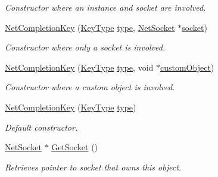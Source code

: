 \begin{DoxyCompactItemize}
\begin{DoxyCompactList}\small\item\em Constructor where an instance and socket are involved. \item\end{DoxyCompactList}\item 
\hyperlink{class_net_completion_key_a2d4ed1339d4b1f0e7a8d7ee00a24b12f}{NetCompletionKey} (\hyperlink{class_net_completion_key_a129b5d89d5f2ac58abcc9872adc85d32}{KeyType} \hyperlink{class_net_completion_key_ab688ca4ac39575c1e1edecbd7fe09a10}{type}, \hyperlink{class_net_socket}{NetSocket} $\ast$\hyperlink{class_net_completion_key_ae4108c1fd628613e8b36eb8d11ac4f5e}{socket})
\begin{DoxyCompactList}\small\item\em Constructor where only a socket is involved. \item\end{DoxyCompactList}\item 
\hyperlink{class_net_completion_key_a91004675386d0efda59d93d7436208b8}{NetCompletionKey} (\hyperlink{class_net_completion_key_a129b5d89d5f2ac58abcc9872adc85d32}{KeyType} \hyperlink{class_net_completion_key_ab688ca4ac39575c1e1edecbd7fe09a10}{type}, void $\ast$\hyperlink{class_net_completion_key_a2d939786562a2b929045159eee0836b3}{customObject})
\begin{DoxyCompactList}\small\item\em Constructor where a custom object is involved. \item\end{DoxyCompactList}\item 
\hyperlink{class_net_completion_key_a1d5c233c1012884dec3737d809c1cd48}{NetCompletionKey} (\hyperlink{class_net_completion_key_a129b5d89d5f2ac58abcc9872adc85d32}{KeyType} \hyperlink{class_net_completion_key_ab688ca4ac39575c1e1edecbd7fe09a10}{type})
\begin{DoxyCompactList}\small\item\em Default constructor. \item\end{DoxyCompactList}\item 
\hyperlink{class_net_socket}{NetSocket} $\ast$ \hyperlink{class_net_completion_key_a179a2ae168d52e747ddb71697c3c74e9}{GetSocket} ()
\begin{DoxyCompactList}\small\item\em Retrieves pointer to socket that owns this object. \item\end{DoxyCompactList}\item 

\end{DoxyCompactItemize}
